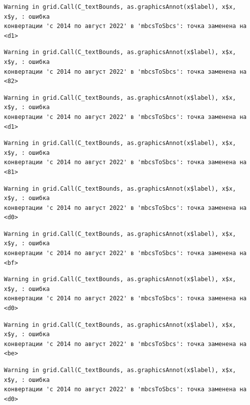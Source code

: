 \documentclass[
  letterpaper,
  DIV=11,
  numbers=noendperiod]{scrreprt}
\begin{document}
\begin{verbatim}
Warning in grid.Call(C_textBounds, as.graphicsAnnot(x$label), x$x, x$y, : ошибка
конвертации 'с 2014 по август 2022' в 'mbcsToSbcs': точка заменена на <d1>
\end{verbatim}

\begin{verbatim}
Warning in grid.Call(C_textBounds, as.graphicsAnnot(x$label), x$x, x$y, : ошибка
конвертации 'с 2014 по август 2022' в 'mbcsToSbcs': точка заменена на <82>
\end{verbatim}

\begin{verbatim}
Warning in grid.Call(C_textBounds, as.graphicsAnnot(x$label), x$x, x$y, : ошибка
конвертации 'с 2014 по август 2022' в 'mbcsToSbcs': точка заменена на <d1>
\end{verbatim}

\begin{verbatim}
Warning in grid.Call(C_textBounds, as.graphicsAnnot(x$label), x$x, x$y, : ошибка
конвертации 'с 2014 по август 2022' в 'mbcsToSbcs': точка заменена на <81>
\end{verbatim}

\begin{verbatim}
Warning in grid.Call(C_textBounds, as.graphicsAnnot(x$label), x$x, x$y, : ошибка
конвертации 'с 2014 по август 2022' в 'mbcsToSbcs': точка заменена на <d0>
\end{verbatim}

\begin{verbatim}
Warning in grid.Call(C_textBounds, as.graphicsAnnot(x$label), x$x, x$y, : ошибка
конвертации 'с 2014 по август 2022' в 'mbcsToSbcs': точка заменена на <bf>
\end{verbatim}

\begin{verbatim}
Warning in grid.Call(C_textBounds, as.graphicsAnnot(x$label), x$x, x$y, : ошибка
конвертации 'с 2014 по август 2022' в 'mbcsToSbcs': точка заменена на <d0>
\end{verbatim}

\begin{verbatim}
Warning in grid.Call(C_textBounds, as.graphicsAnnot(x$label), x$x, x$y, : ошибка
конвертации 'с 2014 по август 2022' в 'mbcsToSbcs': точка заменена на <be>
\end{verbatim}

\begin{verbatim}
Warning in grid.Call(C_textBounds, as.graphicsAnnot(x$label), x$x, x$y, : ошибка
конвертации 'с 2014 по август 2022' в 'mbcsToSbcs': точка заменена на <d0>
\end{verbatim}
\end{document}
